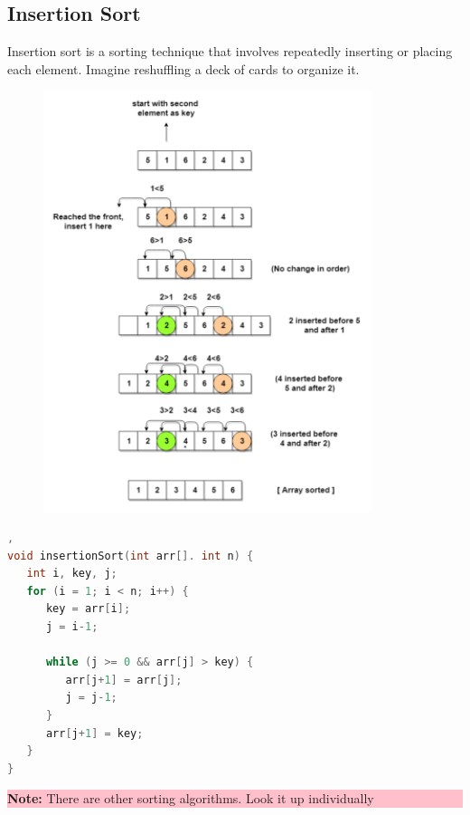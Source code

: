 \subsection{Insertion Sort}
Insertion sort is a sorting technique that involves repeatedly inserting or placing each element. Imagine reshuffling a
deck of cards to organize it.
\begin{figure}[H]
    \centering
    \includegraphics[width=0.5\linewidth]{P4/img/screenshot007.png}
    \caption{}
    \label{fig:tujuh}
\end{figure}
\begin{lstlisting}[language=c,caption=Insertion Sort Implementation], 
void insertionSort(int arr[]. int n) {
   int i, key, j;
   for (i = 1; i < n; i++) {
      key = arr[i];
      j = i-1;
    
      while (j >= 0 && arr[j] > key) {
         arr[j+1] = arr[j];
         j = j-1;
      }
      arr[j+1] = key;
   }
}
\end{lstlisting}

\begin{center}
    \colorbox{pink}{\parbox{0.8\linewidth}{\textbf{Note:} There are other sorting algorithms. Look it up individually}}
\end{center}

